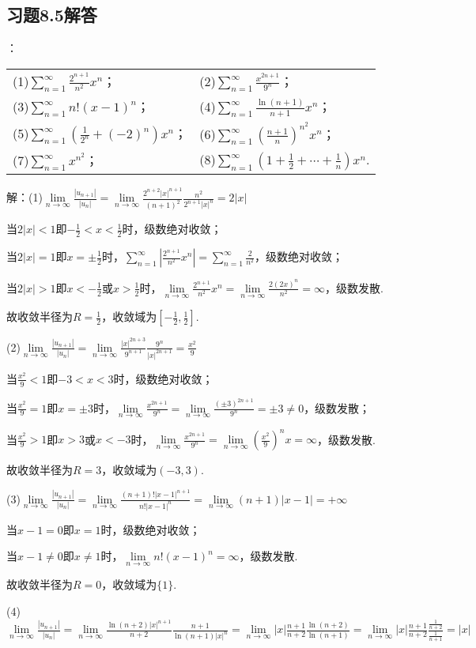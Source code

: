 \documentclass[12pt,UTF8]{ctexart}
\newcommand\Lim[0]{\lim\limits_{n\rightarrow\infty}}
\newcommand\Ser[1]{\sum_{n=#1}^\infty}
\begin{document}
\subsection{习题8.5解答}
\begin{enumerate}
：
\newline
\begin{tabular}{ll}
(1)$\Ser{1}\frac{2^{n+1}}{n^2}x^n$；&(2)$\Ser{1}\frac{x^{2n+1}}{9^n}$；\\
(3)$\Ser{1}n!(x-1)^n$；&(4)$\Ser{1}\frac{\ln(n+1)}{n+1}x^n$；\\
(5)$\Ser{1}(\frac1{2^n}+(-2)^n)x^n$；&(6)$\Ser{1}(\frac{n+1}n)^{n^2}x^n$；\\
(7)$\Ser{1}x^{n^2}$；&(8)$\Ser{1}(1+\frac12+\cdots+\frac1n)x^n$.
\end{tabular}

解：(1)$\Lim\frac{|u_{n+1}|}{|u_n|}=\Lim\frac{2^{n+2}|x|^{n+1}}{(n+1)^2}\frac{n^2}{2^{n+1}|x|^n}=2|x|$

当$2|x|<1$即$-\frac12<x<\frac12$时，级数绝对收敛；

当$2|x|=1$即$x=\pm\frac12$时，$\Ser{1}|\frac{2^{n+1}}{n^2}x^n|=\Ser{1}\frac2{n^2}$，级数绝对收敛；

当$2|x|>1$即$x<-\frac12$或$x>\frac12$时，$\Lim\frac{2^{n+1}}{n^2}x^n=\Lim\frac{2(2x)^n}{n^2}=\infty$，级数发散.

故收敛半径为$R=\frac12$，收敛域为$[-\frac12,\frac12]$.

(2)$\Lim\frac{|u_{n+1}|}{|u_n|}=\Lim\frac{|x|^{2n+3}}{9^{n+1}}\frac{9^n}{|x|^{2n+1}}=\frac{x^2}9$

当$\frac{x^2}9<1$即$-3<x<3$时，级数绝对收敛；

当$\frac{x^2}9=1$即$x=\pm3$时，$\Lim\frac{x^{2n+1}}{9^n}=\Lim\frac{(\pm3)^{2n+1}}{9^n}=\pm3\neq0$，级数发散；

当$\frac{x^2}9>1$即$x>3$或$x<-3$时，$\Lim\frac{x^{2n+1}}{9^n}=\Lim(\frac{x^2}9)^nx=\infty$，级数发散.

故收敛半径为$R=3$，收敛域为$(-3,3)$.

(3)$\Lim\frac{|u_{n+1}|}{|u_n|}=\Lim\frac{(n+1)!|x-1|^{n+1}}{n!|x-1|^n}=\Lim(n+1)|x-1|=+\infty$

当$x-1=0$即$x=1$时，级数绝对收敛；

当$x-1\neq0$即$x\neq1$时，$\Lim n!(x-1)^n=\infty$，级数发散.

故收敛半径为$R=0$，收敛域为$\{1\}$.

(4)$\Lim\frac{|u_{n+1}|}{|u_n|}=\Lim\frac{\ln(n+2)|x|^{n+1}}{n+2}\frac{n+1}{\ln(n+1)|x|^n}=\Lim|x|\frac{n+1}{n+2}\frac{\ln(n+2)}{\ln(n+1)}=\Lim|x|\frac{n+1}{n+2}\frac{\frac1{n+2}}{\frac1{n+1}}=|x|$


\end{enumerate}
\end{document}
